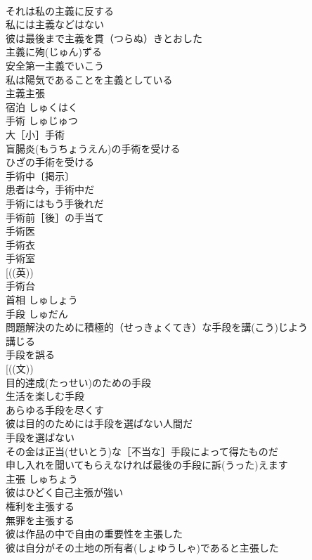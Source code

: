 \documentclass[8pt]{extreport}
\begin{document}
\begin{CJK}{UTF8}{min}
\\	それは私の主義に反する 
\\	私には主義などはない 
\\	彼は最後まで主義を貫（つらぬ）きとおした 
\\	主義に殉(じゅん)ずる 
\\	安全第一主義でいこう 
\\	私は陽気であることを主義としている 
\\	主義主張 
\\	宿泊	しゅくはく	
\\	手術	しゅじゅつ	
\\	大［小］手術 
\\	盲腸炎(もうちょうえん)の手術を受ける 
\\	ひざの手術を受ける 
\\	手術中〔掲示〕 
\\	患者は今，手術中だ 
\\	手術にはもう手後れだ 
\\	手術前［後］の手当て 
\\	手術医 
\\	手術衣 
\\	手術室 
\\	[((英)) 
\\	手術台 
\\	首相	しゅしょう	
\\	手段	しゅだん	
\\	問題解決のために積極的（せっきょくてき）な手段を講(こう)じよう 
\\	講じる　
\\	手段を誤る 
\\	[((文)) 
\\	目的達成(たっせい)のための手段 
\\	生活を楽しむ手段 
\\	あらゆる手段を尽くす 
\\	彼は目的のためには手段を選ばない人間だ 
\\	手段を選ばない 
\\	その金は正当(せいとう)な［不当な］手段によって得たものだ 
\\	申し入れを聞いてもらえなければ最後の手段に訴(うった)えます 
\\	主張	しゅちょう	
\\	彼はひどく自己主張が強い 
\\	権利を主張する 
\\	無罪を主張する 
\\	彼は作品の中で自由の重要性を主張した 
\\	彼は自分がその土地の所有者(しょゆうしゃ)であると主張した 

\end{CJK}
\end{document}
